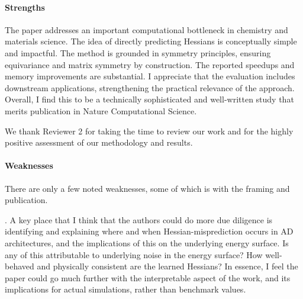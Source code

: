 \documentclass[11pt,letterpaper]{article}
\begin{document}
\paragraph{Strengths}

\noindent The paper addresses an important computational bottleneck in chemistry and materials science. The idea of directly predicting Hessians is conceptually simple and impactful. The method is grounded in symmetry principles, ensuring equivariance and matrix symmetry by construction. The reported speedups and memory improvements are substantial. I appreciate that the evaluation includes downstream applications, strengthening the practical relevance of the approach. Overall, I find this to be a technically sophisticated and well-written study that merits publication in Nature Computational Science.

\vspace{1mm}
{\color{responsecolour}
\noindent We thank Reviewer 2 for taking the time to review our work and for the highly positive assessment of our methodology and results.
}
\vspace{5mm}

\paragraph{Weaknesses}

\noindent There are only a few noted weaknesses, some of which is with the framing and publication.


. A key place that I think that the authors could do more due diligence is identifying and explaining where and when Hessian-misprediction occurs in AD architectures, and the implications of this on the underlying energy surface. Is any of this attributable to underlying noise in the energy surface? How well-behaved and physically consistent are the learned Hessians? In essence, I feel the paper could go much further with the interpretable aspect of the work, and its implications for actual simulations, rather than benchmark values.
\end{document}
